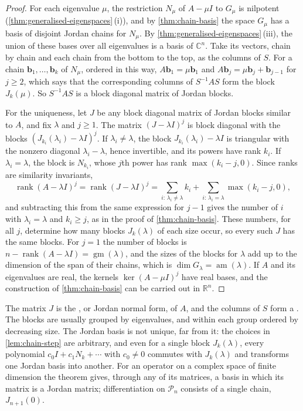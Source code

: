 \begin{proof}
For each eigenvalue $\mu$, the restriction $N_\mu$ of $A-\mu I$ to $G_\mu$ is nilpotent (\cref{thm:generalised-eigenspaces}\,(i)), and by \cref{thm:chain-basis} the space $G_\mu$ has a basis of disjoint Jordan chains for $N_\mu$. By \cref{thm:generalised-eigenspaces}\,(iii), the union of these bases over all eigenvalues is a basis of $\mathbb C^n$. Take its vectors, chain by chain and each chain from the bottom to the top, as the columns of $S$. For a chain $\mathbf b_1,\ldots,\mathbf b_k$ of $N_\mu$, ordered in this way, $A\mathbf b_1=\mu\mathbf b_1$ and $A\mathbf b_j=\mu\mathbf b_j+\mathbf b_{j-1}$ for $j\ge2$, which says that the corresponding columns of $S^{-1}AS$ form the block $J_k(\mu)$. So $S^{-1}AS$ is a block diagonal matrix of Jordan blocks.

For the uniqueness, let $J$ be any block diagonal matrix of Jordan blocks similar to $A$, and fix $\lambda$ and $j\ge1$. The matrix $(J-\lambda I)^j$ is block diagonal with the blocks $(J_{k_i}(\lambda_i)-\lambda I)^j$. If $\lambda_i\ne\lambda$, the block $J_{k_i}(\lambda_i)-\lambda I$ is triangular with the nonzero diagonal $\lambda_i-\lambda$, hence invertible, and its powers have rank $k_i$. If $\lambda_i=\lambda$, the block is $N_{k_i}$, whose $j$th power has rank $\max(k_i-j,0)$. Since ranks are similarity invariants,
\[
\operatorname{rank}(A-\lambda I)^j=\operatorname{rank}(J-\lambda I)^j=\sum_{i:\,\lambda_i\ne\lambda}k_i+\sum_{i:\,\lambda_i=\lambda}\max(k_i-j,0),
\]
and subtracting this from the same expression for $j-1$ gives the number of $i$ with $\lambda_i=\lambda$ and $k_i\ge j$, as in the proof of \cref{thm:chain-basis}. These numbers, for all $j$, determine how many blocks $J_k(\lambda)$ of each size occur, so every such $J$ has the same blocks. For $j=1$ the number of blocks is $n-\operatorname{rank}(A-\lambda I)=\operatorname{gm}(\lambda)$, and the sizes of the blocks for $\lambda$ add up to the dimension of the span of their chains, which is $\dim G_\lambda=\operatorname{am}(\lambda)$. If $A$ and its eigenvalues are real, the kernels $\ker(A-\mu I)^j$ have real bases, and the construction of \cref{thm:chain-basis} can be carried out in $\mathbb R^n$.
\end{proof}

The matrix $J$ is the , or Jordan normal form, of $A$, and the columns of $S$ form a . The blocks are usually grouped by eigenvalues, and within each group ordered by decreasing size. The Jordan basis is not unique, far from it: the choices in \cref{lem:chain-step} are arbitrary, and even for a single block $J_k(\lambda)$, every polynomial $c_0I+c_1N_k+\cdots$ with $c_0\ne0$ commutes with $J_k(\lambda)$ and transforms one Jordan basis into another. For an operator on a complex space of finite dimension the theorem gives, through any of its matrices, a basis in which its matrix is a Jordan matrix; differentiation on $\mathcal P_n$ consists of a single chain, $J_{n+1}(0)$.

